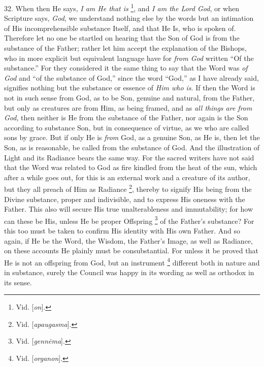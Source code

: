 32. When then He says, \emph{I am
He that is} \footnote{Vid. [\emph{on}].}, and \emph{I
am the Lord God}, or when Scripture says, \emph{God}, we understand
nothing else by the words but an intimation of His incomprehensible
substance Itself, and that He Is, who is spoken of. Therefore let no
one be startled on hearing that the Son of God is from the substance
of the Father; rather let him accept the explanation of the Bishops,
who in more explicit but equivalent language have for \emph{from God}
written ``Of the substance.'' For they considered it the same thing to
say that the Word was \emph{of God} and ``of the substance of God,''
since the word ``God,'' as I have already said, signifies nothing but
the substance or essence of \emph{Him who is}. If then the Word is not
in such sense from God, as to be Son, genuine and natural, from the
Father, but only as creatures are from Him, as being framed, and as \emph{all
things are from God}, then neither is He from the substance of the
Father, nor again is the Son according to substance Son, but in
consequence of virtue, as we who are called sons by grace. But if only
He is \emph{from} God, as a genuine Son, as He is, then let the Son,
as is reasonable, be called from the substance of God. And the
illustration of Light and its Radiance bears the same way. For the
sacred writers have not said that the Word was related to God as fire
kindled from the heat of the sun, which after a while goes out, for
this is an external work and a creature of its author, but they all
preach of Him as Radiance \footnote{Vid. [\emph{apaugasma}].},
thereby to signify His being from the Divine substance, proper and
indivisible, and to express His oneness with the Father. This also
will secure His true unalterableness and immutability; for how can
these be His, unless He be proper Offspring \footnote{Vid. [\emph{genn\={e}ma}].} of the Father's substance? For this too must be taken to
confirm His identity with His own Father. And so again, if He be the
Word, the Wisdom, the Father's Image, as well as Radiance, on these
accounts He plainly must be consubstantial. For unless it be proved
that He is not an offspring from God, but an instrument \footnote{Vid. [\emph{organon}].} different both in nature and in substance, surely the Council
was happy in its wording as well as orthodox in its sense.

